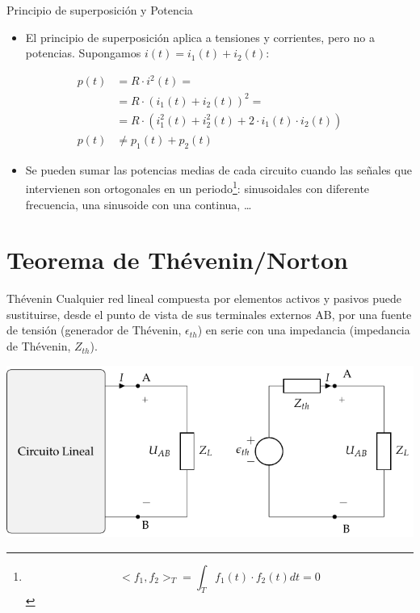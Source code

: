 \documentclass[xcolor={usenames,svgnames,dvipsnames}]{beamer}
\begin{document}
\begin{frame}[label={sec:orge7e2132}]{Principio de superposición y Potencia}
\begin{itemize}
\item El principio de superposición aplica a tensiones y corrientes, pero \alert{no} a potencias. Supongamos \(i(t) = i_1(t) + i_2(t)\):
\end{itemize}
\begin{align*}
  p(t) &= R \cdot i^2(t) =\\
       &= R \cdot (i_1(t) + i_2(t))^2 =\\
       &=R \cdot (i_1^2(t) + i_2^2(t) + 2\cdot i_1(t) \cdot i_2(t))\\
  p(t) &\neq p_1(t) + p_2(t)
\end{align*}
\begin{itemize}
\item Se pueden sumar las potencias \alert{medias} de cada circuito cuando las señales que intervienen son ortogonales en un periodo\footnote{\[<f_1, f_2>_T = \int_T f_1(t) \cdot f_2(t) dt = 0\]}: sinusoidales con diferente frecuencia, una sinusoide con una continua, \ldots{}
\end{itemize}
\end{frame}



\section{Teorema de Thévenin/Norton}
\label{sec:org7e4c06c}

\begin{frame}[label={sec:org011002b}]{Thévenin}
Cualquier \alert{red lineal} compuesta por elementos activos y pasivos puede sustituirse, desde el punto de vista de sus terminales externos AB, por una \alert{fuente de tensión} (generador de Thévenin, \(\epsilon_{th}\)) en \alert{serie} con una impedancia (impedancia de Thévenin, \(Z_{th}\)).

\begin{center}
\includegraphics[width=.9\linewidth]{figs/EquivalenteThevenin.pdf}
\end{center}
\end{frame}
\end{document}
